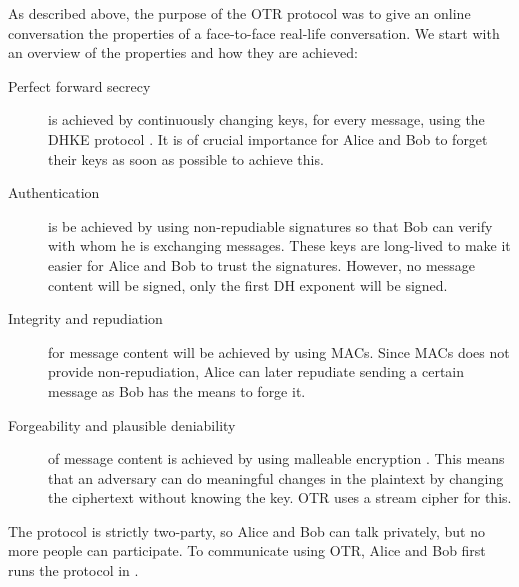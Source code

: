 As described above, the purpose of the \ac{OTR} protocol was to give an online 
conversation the properties of a face-to-face real-life conversation.
We start with an overview of the properties and how they are achieved:
\begin{description}
  \item[Perfect forward secrecy] is achieved by continuously changing keys, for 
    every message, using the \ac{DHKE} protocol \cite{dh}.
    It is of crucial importance for Alice and Bob to forget their keys as soon 
    as possible to achieve this.

  \item[Authentication] is be achieved by using non-repudiable signatures so 
    that Bob can verify with whom he is exchanging messages.
    These keys are long-lived to make it easier for Alice and Bob to trust the 
    signatures.
    However, no message content will be signed, only the first \ac{DH} exponent 
    will be signed.

  \item[Integrity and repudiation] for message content will be achieved by 
    using \acp{MAC}.
    Since \acp{MAC} does not provide non-repudiation, Alice can later repudiate 
    sending a certain message as Bob has the means to forge it.

  \item[Forgeability and plausible deniability] of message content is achieved 
    by using malleable encryption \cite{nonmalleable}.
    This means that an adversary can do meaningful changes in the plaintext by 
    changing the ciphertext without knowing the key.
    \ac{OTR} uses a stream cipher for this.
\end{description}

The protocol is strictly two-party, so Alice and Bob can talk privately, but no 
more people can participate.
To communicate using \ac{OTR}, Alice and Bob first runs the protocol in 
.

